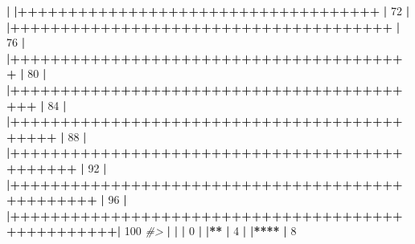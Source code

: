 \documentclass[]{article}
\newenvironment{Shaded}{\begin{snugshade}}{\end{snugshade}}
\newcommand{\CommentTok}[1]{\textcolor[rgb]{0.56,0.35,0.01}{\textit{#1}}}
\newcommand{\DecValTok}[1]{\textcolor[rgb]{0.00,0.00,0.81}{#1}}
\newcommand{\ErrorTok}[1]{\textcolor[rgb]{0.64,0.00,0.00}{\textbf{#1}}}
\newcommand{\NormalTok}[1]{#1}
\newcommand{\OperatorTok}[1]{\textcolor[rgb]{0.81,0.36,0.00}{\textbf{#1}}}
\newcommand{\StringTok}[1]{\textcolor[rgb]{0.31,0.60,0.02}{#1}}
\begin{document}
\begin{Shaded}
\begin{Highlighting}[]
{{{{{{{{{{{{{{{{{{  \OperatorTok{|}\StringTok{                                                        }
\StringTok{  }\ErrorTok{|}\OperatorTok{++++++++++++++++++++++++++++++++++++}\StringTok{              }\ErrorTok{|}\StringTok{  }\DecValTok{72}\NormalTok{%
  \OperatorTok{|}\StringTok{                                                        }
\StringTok{  }\ErrorTok{|}\OperatorTok{++++++++++++++++++++++++++++++++++++++}\StringTok{            }\ErrorTok{|}\StringTok{  }\DecValTok{76}\NormalTok{%
  \OperatorTok{|}\StringTok{                                                        }
\StringTok{  }\ErrorTok{|}\OperatorTok{++++++++++++++++++++++++++++++++++++++++}\StringTok{          }\ErrorTok{|}\StringTok{  }\DecValTok{80}\NormalTok{%
  \OperatorTok{|}\StringTok{                                                        }
\StringTok{  }\ErrorTok{|}\OperatorTok{++++++++++++++++++++++++++++++++++++++++++}\StringTok{        }\ErrorTok{|}\StringTok{  }\DecValTok{84}\NormalTok{%
  \OperatorTok{|}\StringTok{                                                        }
\StringTok{  }\ErrorTok{|}\OperatorTok{++++++++++++++++++++++++++++++++++++++++++++}\StringTok{      }\ErrorTok{|}\StringTok{  }\DecValTok{88}\NormalTok{%
  \OperatorTok{|}\StringTok{                                                        }
\StringTok{  }\ErrorTok{|}\OperatorTok{++++++++++++++++++++++++++++++++++++++++++++++}\StringTok{    }\ErrorTok{|}\StringTok{  }\DecValTok{92}\NormalTok{%
  \OperatorTok{|}\StringTok{                                                        }
\StringTok{  }\ErrorTok{|}\OperatorTok{++++++++++++++++++++++++++++++++++++++++++++++++}\StringTok{  }\ErrorTok{|}\StringTok{  }\DecValTok{96}\NormalTok{%
  \OperatorTok{|}\StringTok{                                                        }
\StringTok{  }\ErrorTok{|}\OperatorTok{++++++++++++++++++++++++++++++++++++++++++++++++++}\ErrorTok{|}\StringTok{ }\DecValTok{100}\NormalTok{%
\CommentTok{#> }
  \OperatorTok{|}\StringTok{                                                        }
\StringTok{  }\ErrorTok{|}\StringTok{                                                  }\ErrorTok{|}\StringTok{   }\DecValTok{0}\NormalTok{%
  \OperatorTok{|}\StringTok{                                                        }
\StringTok{  }\ErrorTok{|**}\StringTok{                                                }\ErrorTok{|}\StringTok{   }\DecValTok{4}\NormalTok{%
  \OperatorTok{|}\StringTok{                                                        }
\StringTok{  }\ErrorTok{|****}\StringTok{                                              }\ErrorTok{|}\StringTok{   }\DecValTok{8}\NormalTok{%
}}}}}}}}}}}}}}}}}}}}}}}}}}}}}
\end{Highlighting}
\end{Shaded}
\end{document}
